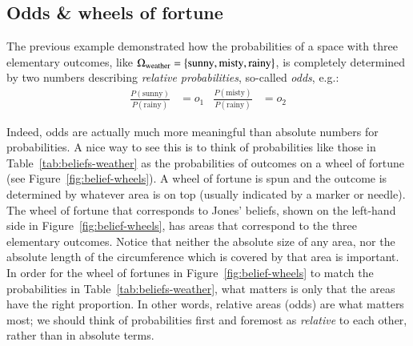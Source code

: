 \documentclass[nobib,nofonts]{tufte-handout}
\begin{document}
\subsection{Odds \& wheels of fortune}

The previous example demonstrated how the probabilities of a space with three elementary outcomes, like $\Omega_{\text{weather}} = \left\{\text{sunny}, \text{misty}, \text{rainy}\right\}$, is completely determined by two numbers describing \emph{relative probabilities}, so-called \emph{odds}, e.g.:
\begin{align*}
  \frac{P(\text{sunny})}{P(\text{rainy})} & = o_{1} & \frac{P(\text{misty})}{P(\text{rainy})} & = o_{2}
\end{align*}

Indeed, odds are actually much more meaningful than absolute numbers for probabilities.
A nice way to see this is to think of probabilities like those in Table~\ref{tab:beliefs-weather} as the probabilities of outcomes on a wheel of fortune (see Figure~\ref{fig:belief-wheels}).
A wheel of fortune is spun and the outcome is determined by whatever area is on top (usually indicated by a marker or needle).
The wheel of fortune that corresponds to Jones' beliefs, shown on the left-hand side in Figure~\ref{fig:belief-wheels}, has areas that correspond to the three elementary outcomes.
Notice that neither the absolute size of any area, nor the absolute length of the circumference which is covered by that area is important.
In order for the wheel of fortunes in Figure~\ref{fig:belief-wheels} to match the probabilities in Table~\ref{tab:beliefs-weather}, what matters is only that the areas have the right proportion.
In other words, relative areas (odds) are what matters most; we should think of probabilities first and foremost as \emph{relative} to each other, rather than in absolute terms.
\end{document}
